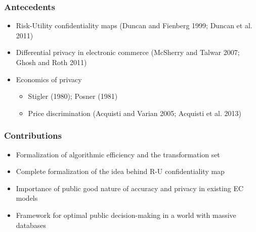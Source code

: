 \begin{frame}[allowframebreaks]%
\frametitle{Antecedents}
\begin{itemize}
	\item Risk-Utility confidentiality maps (Duncan and Fienberg 1999; Duncan et al. 2011) \vspace*{.25in}
	\item Differential privacy in electronic commerce (McSherry and Talwar 2007; Ghosh and Roth 2011) \vspace*{.25in}
	\item Economics of privacy
	\begin{itemize}
		\item Stigler (1980); Posner (1981)
		\item Price discrimination (Acquisti and Varian 2005; Acquisti et al. 2013)
	\end{itemize}
\end{itemize}

\end{frame}%
%

\begin{frame}[allowframebreaks]%
\frametitle{Contributions}
\begin{itemize}
    \item Formalization of algorithmic efficiency and the transformation set \vspace*{0.25in}
	\item Complete formalization of the idea behind R-U confidentiality map \vspace*{0.25in}
	\item Importance of public good nature of accuracy and privacy in existing EC models \vspace*{0.25in}
	\item Framework for optimal public decision-making in a world with massive databases
	
\end{itemize}


\end{frame}%




